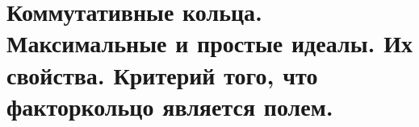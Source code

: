 \section{
    Коммутативные кольца. Максимальные и простые идеалы. Их свойства. Критерий того, что факторкольцо является полем.
}




